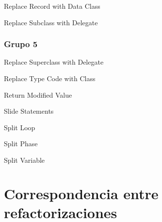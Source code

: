 \documentclass[11pt,a4paper,oneside]{book}
\begin{document}
Replace Record with Data Class

Replace Subclass with Delegate

\subsection{Grupo 5}
Replace Superclass with Delegate

Replace Type Code with Class

Return Modified Value

Slide Statements

Split Loop

Split Phase

Split Variable



\chapter*{Correspondencia entre refactorizaciones}
\end{document}
